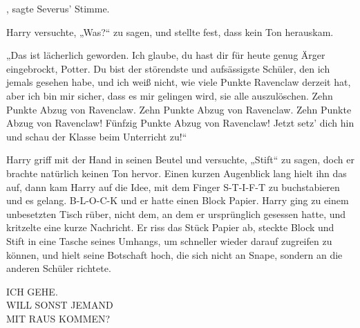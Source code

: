 , sagte Severus’ Stimme.

Harry versuchte,
„Was?“ zu sagen, und stellte fest, dass kein Ton herauskam.

„Das ist lächerlich geworden. Ich glaube, du hast dir für heute genug Ärger eingebrockt, Potter. Du bist der störendste und aufsässigste Schüler, den ich jemals gesehen habe, und ich weiß nicht, wie viele Punkte Ravenclaw derzeit hat, aber ich bin mir sicher, dass es mir gelingen wird, sie alle auszulöschen. Zehn Punkte Abzug von Ravenclaw. Zehn Punkte Abzug von Ravenclaw. Zehn Punkte Abzug von Ravenclaw! Fünfzig Punkte Abzug von Ravenclaw! Jetzt setz’ dich hin und schau der Klasse beim Unterricht zu!“

Harry griff mit der Hand in seinen Beutel und versuchte,
„Stift“ zu sagen, doch er brachte natürlich keinen Ton hervor. Einen kurzen Augenblick lang hielt ihn das auf, dann kam Harry auf die Idee, mit dem Finger S-T-I-F-T zu buchstabieren und es gelang. B-L-O-C-K und er hatte einen Block Papier. Harry ging zu einem unbesetzten Tisch rüber, nicht dem, an dem er ursprünglich gesessen hatte, und kritzelte eine kurze Nachricht. Er riss das Stück Papier ab, steckte Block und Stift in eine Tasche seines Umhangs, um schneller wieder darauf zugreifen zu können, und hielt seine Botschaft hoch, die sich nicht an Snape, sondern an die anderen Schüler richtete.

\begin{writtenNote}
ICH GEHE.\\
WILL SONST JEMAND\\
MIT RAUS KOMMEN?
\end{writtenNote}

